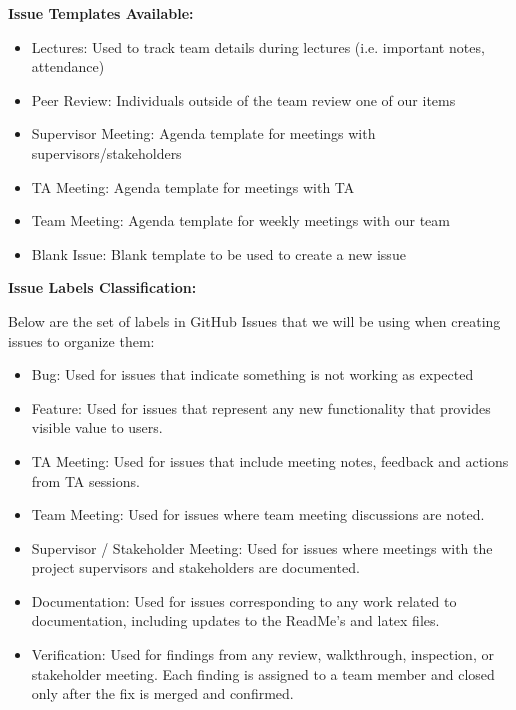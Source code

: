 \documentclass{article}
\begin{document}
\begin{itemize}
          \textbf{Issue Templates Available:}
          \begin{itemize}
              \item Lectures: Used to track team details during lectures (i.e.
                    important notes, attendance)
              \item Peer Review: Individuals outside of the team review one of
                    our items
              \item Supervisor Meeting: Agenda template for meetings with
                    supervisors/stakeholders
              \item TA Meeting: Agenda template for meetings with TA
              \item Team Meeting: Agenda template for weekly meetings with our
                    team
              \item Blank Issue: Blank template to be used to create a new
                    issue \\
          \end{itemize}

          \textbf{Issue Labels Classification:}

          Below are the set of labels in GitHub Issues that we will be using
          when creating issues to organize them:

          \begin{itemize}
              \item Bug: Used for issues that indicate something is not working
                    as expected
              \item Feature: Used for issues that represent any new
                    functionality that provides visible value to users.
              \item TA Meeting: Used for issues that include meeting notes,
                    feedback and actions from TA sessions.
              \item Team Meeting: Used for issues where team meeting
                    discussions are noted.
              \item Supervisor / Stakeholder Meeting: Used for issues where
                    meetings with the project supervisors and stakeholders are
                    documented.
              \item Documentation: Used for issues corresponding to any work
                    related to documentation, including updates to the ReadMe's
                    and latex files.
              \item Verification: Used for findings from any review,
                    walkthrough, inspection, or stakeholder meeting. Each
                    finding is assigned to a team member and closed only after
                    the fix is merged and confirmed.
          \end{itemize}


\end{itemize}
\end{document}
